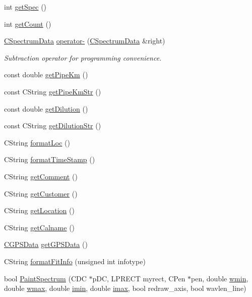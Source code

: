 \begin{DoxyCompactItemize}
\item 
int \hyperlink{classCSpectrumData_a73ffc6f777304a9ab71f9f2242abd293}{getSpec} ()
\item 
int \hyperlink{classCSpectrumData_ae68ed5a190b3b2a129dccc50a5fd5de0}{getCount} ()
\item 
\hyperlink{classCSpectrumData}{CSpectrumData} \hyperlink{classCSpectrumData_a687fe9bea67f053428d84d82a5bccea0}{operator-\/} (\hyperlink{classCSpectrumData}{CSpectrumData} \&right)
\begin{DoxyCompactList}\small\item\em Subtraction operator for programming convenience. \item\end{DoxyCompactList}\item 
const double \hyperlink{classCSpectrumData_abdbd9298afe42940b4a67e2735bb77b8}{getPipeKm} ()
\item 
const CString \hyperlink{classCSpectrumData_a0dc6cf15eae66ee85b208ab228cb9d81}{getPipeKmStr} ()
\item 
const double \hyperlink{classCSpectrumData_a8d5603a6a16f85675877b538f959ef06}{getDilution} ()
\item 
const CString \hyperlink{classCSpectrumData_ac4d2e65a32bb97f701ac981c188ae9e7}{getDilutionStr} ()
\item 
CString \hyperlink{classCSpectrumData_ad20ae12fdc5d85e3acaba66d6f928abe}{formatLoc} ()
\item 
CString \hyperlink{classCSpectrumData_a9148976899393b383e94e53508d7e2fd}{formatTimeStamp} ()
\item 
CString \hyperlink{classCSpectrumData_a3ac6a6f0f3cdce11bcc3c2d523284c0f}{getComment} ()
\item 
CString \hyperlink{classCSpectrumData_acb0de37fac5694b4fc9a55c679a9d71b}{getCustomer} ()
\item 
CString \hyperlink{classCSpectrumData_afcf57b1a56307f1fe2d0e7700b3a305e}{getLocation} ()
\item 
CString \hyperlink{classCSpectrumData_aae050d0d0dc7d9201d8fbbb31e81e2f8}{getCalname} ()
\item 
\hyperlink{classCGPSData}{CGPSData} \hyperlink{classCSpectrumData_a2ae39f66269f0af56d418c4bcfb9dfb7}{getGPSData} ()
\item 
CString \hyperlink{classCSpectrumData_adbfee26fbd16da25611b9e35690516ea}{formatFitInfo} (unsigned int infotype)
\item 
bool \hyperlink{classCSpectrumData_a5d8ef18534b4841dd4019819b9856988}{PaintSpectrum} (CDC $\ast$pDC, LPRECT myrect, CPen $\ast$pen, double \hyperlink{classCSpectrumData_ae983387d5ee053605067fcd9c6de834d}{wmin}, double \hyperlink{classCSpectrumData_a6f3d5bafa576e363c7cee48c2fd2612f}{wmax}, double \hyperlink{classCSpectrumData_a3d8c558ec07ad4a7bb1f713810b823c1}{imin}, double \hyperlink{classCSpectrumData_a00501108e9e51562df5bbe3fefdcd929}{imax}, bool redraw\_\-axis, bool wavlen\_\-line)

\end{DoxyCompactItemize}
